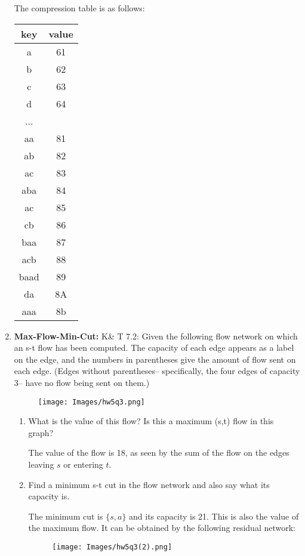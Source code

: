 \documentclass[letterpaper, 11pt]{article}
\begin{document}
\begin{enumerate}
    The compression table is as follows:
    \begin{table}[H]
        \centering
        \begin{tabular}{c|c}
            key & value \\
            \hline
            a & 61\\
            b & 62\\
            c & 63\\
            d & 64\\
            ... & \\
            aa & 81\\
            ab & 82\\
            ac & 83\\
            aba & 84\\
            ac & 85\\
            cb & 86\\
            baa & 87\\
            acb & 88\\
            baad & 89\\
            da & 8A\\
            aaa & 8b
        \end{tabular}
    \end{table}
    
    \item \textbf{Max-Flow-Min-Cut:} K\& T 7.2: Given the following flow network on which an s-t flow has been computed. The capacity of each edge appears as a label on the edge, and the numbers in parentheses give the amount of flow sent on each edge. (Edges without parentheses– specifically, the four edges of capacity 3– have no flow being sent on them.)
    \begin{figure}[H]
        \centering
        \texttt{[image: Images/hw5q3.png]}
    \end{figure}
    \begin{enumerate}
        \item What is the value of this flow? Is this a maximum (s,t) flow in this graph?

        The value of the flow is 18, as seen by the sum of the flow on the edges leaving $s$ or entering $t$.
        
        \item Find a minimum s-t cut in the flow network and also say what its capacity is.

        The minimum cut is $\{s,a\}$ and its capacity is 21. This is also the value of the maximum flow. It can be obtained by the following residual network:
        \begin{figure}[H]
            \centering
            \texttt{[image: Images/hw5q3(2).png]}
        \end{figure}
    \end{enumerate}


\end{enumerate}
\end{document}
